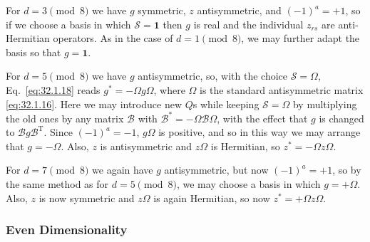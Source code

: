 For \(d=3\pmod 8\) we have \(g\) symmetric, \(z\) antisymmetric, and
\((-1)^a=+1\), so if we choose a basis in which
\(\mathcal S=\mathbf{1}\) then \(g\) is real and the individual \(z_{rs}\)
are anti-Hermitian operators. As in the case of \(d=1\pmod 8\), we may
further adapt the basis so that \(g=\mathbf{1}\).

For \(d=5\pmod 8\) we have \(g\) antisymmetric, so, with the choice
\(\mathcal S=\Omega\), Eq.~\eqref{eq:32.1.18} reads
\(g^*=-\Omega g\Omega\), where \(\Omega\) is the standard antisymmetric
matrix \eqref{eq:32.1.16}. Here we may introduce new \(Q\)s while keeping
\(\mathcal S=\Omega\) by multiplying the old ones by any matrix
\(\mathcal B\) with \(\mathcal B^*=-\Omega\mathcal B\Omega\), with the
effect that \(g\) is changed to \(\mathcal B g\mathcal B^{\mathrm T}\).
Since \((-1)^a=-1\), \(g\Omega\) is positive, and so in this way we may
arrange that \(g=-\Omega\). Also, \(z\) is antisymmetric and \(z\Omega\)
is Hermitian, so \(z^*=-\Omega z\Omega\).

For \(d=7\pmod 8\) we again have \(g\) antisymmetric, but now
\((-1)^a=+1\), so by the same method as for \(d=5\pmod 8\), we may choose
a basis in which \(g=+\Omega\). Also, \(z\) is now symmetric and
\(z\Omega\) is again Hermitian, so now \(z^*=+\Omega z\Omega\).

\subsubsection*{Even Dimensionality}

